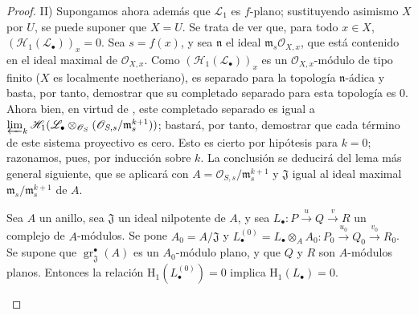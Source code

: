 \begin{proof}
\medskip
II) Supongamos ahora además que $\mathcal L_1$ es $f$-plano; sustituyendo asimismo $X$ por $U$, se puede suponer que $X=U$.
Se trata de ver que, para todo $x\in X$, $(\mathcal H_1(\mathcal L_\bullet))_x=0$.
Sea $s=f(x)$, y sea $\mathfrak n$ el ideal $\mathfrak m_s\mathcal O_{X,x}$, que está contenido en el ideal maximal de $\mathcal O_{X,x}$.
Como $(\mathcal H_1(\mathcal L_\bullet))_x$ es un $\mathcal O_{X,x}$-módulo de tipo finito ($X$ es localmente noetheriano), es separado para la topología $\mathfrak n$-ádica  y basta, por tanto, demostrar que su completado separado para esta topología es 0.
Ahora bien, en virtud de , este completado separado es igual a
$\varprojlim_k\mathcal H_1(\mathcal L_\bullet\otimes_{\mathcal O_S}
(\mathcal O_{S,s}/\mathfrak m_s^{k+1}))$; bastará, por tanto, demostrar que cada término de este sistema proyectivo es cero.
Esto es cierto por hipótesis para $k=0$; razonamos, pues, por inducción sobre $k$.
La conclusión se deducirá del lema más general siguiente, que se aplicará con $A=\mathcal O_{S,s}/\mathfrak m_s^{k+1}$ y $\mathfrak J$ igual al ideal maximal $\mathfrak m_s/\mathfrak m_s^{k+1}$ de $A$.

\begin{lemma}[12.3.3.5]
\label{IV.12.3.3.5}
Sea $A$ un anillo, sea $\mathfrak J$ un ideal nilpotente de $A$, y sea
$L_\bullet:P\xrightarrow{u}Q\xrightarrow{v}R$ un complejo de $A$-módulos.
Se pone $A_0=A/\mathfrak J$ y
$L_\bullet^{(0)}=L_\bullet\otimes_AA_0:
P_0\xrightarrow{u_0}Q_0\xrightarrow{v_0}R_0$.
Se supone que $\operatorname{gr}_{\mathfrak J}^{\bullet}(A)$ es un $A_0$-módulo plano, y que $Q$ y $R$ son $A$-módulos planos.
Entonces la relación $\mathrm H_1(L_\bullet^{(0)})=0$ implica $\mathrm H_1(L_\bullet)=0$.
\end{lemma}


\end{proof}
